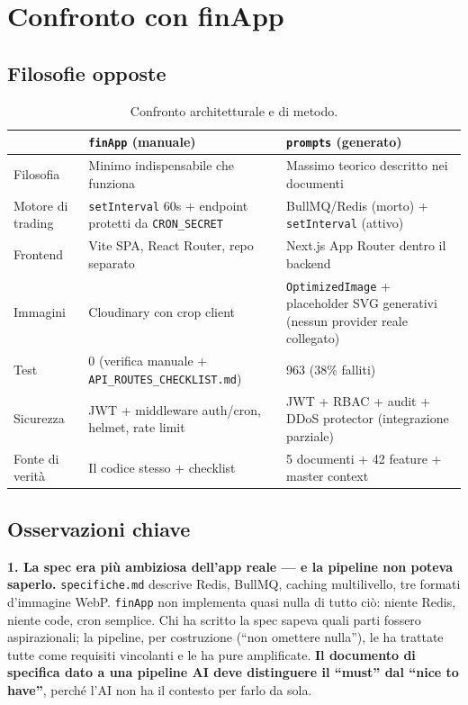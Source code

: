 \documentclass[11pt,a4paper]{article}
\newcommand{\file}[1]{\texttt{\small #1}}
\begin{document}
\section{Confronto con finApp}

\subsection{Filosofie opposte}

\begin{table}[h!]
\centering
\small
\begin{tabular}{p{4.2cm}p{4.9cm}p{4.9cm}}
\toprule
& \textbf{\file{finApp} (manuale)} & \textbf{\file{prompts} (generato)} \\
\midrule
Filosofia & Minimo indispensabile che funziona & Massimo teorico descritto nei documenti \\
Motore di trading & \file{setInterval} 60s + endpoint protetti da \file{CRON\_SECRET} & BullMQ/Redis (morto) + \file{setInterval} (attivo) \\
Frontend & Vite SPA, React Router, repo separato & Next.js App Router dentro il backend \\
Immagini & Cloudinary con crop client & \file{OptimizedImage} + placeholder SVG generativi (nessun provider reale collegato) \\
Test & 0 (verifica manuale + \file{API\_ROUTES\_CHECKLIST.md}) & 963 (38\% falliti) \\
Sicurezza & JWT + middleware auth/cron, helmet, rate limit & JWT + RBAC + audit + DDoS protector (integrazione parziale) \\
Fonte di verit\`a & Il codice stesso + checklist & 5 documenti + 42 feature + master context \\
\bottomrule
\end{tabular}
\caption{Confronto architetturale e di metodo.}
\end{table}

\subsection{Osservazioni chiave}

\textbf{1. La spec era pi\`u ambiziosa dell'app reale --- e la pipeline non poteva saperlo.} \file{specifiche.md} descrive Redis, BullMQ, caching multilivello, tre formati d'immagine WebP. \file{finApp} non implementa quasi nulla di tutto ci\`o: niente Redis, niente code, cron semplice. Chi ha scritto la spec sapeva quali parti fossero aspirazionali; la pipeline, per costruzione (``non omettere nulla''), le ha trattate tutte come requisiti vincolanti e le ha pure amplificate. \textbf{Il documento di specifica dato a una pipeline AI deve distinguere il ``must'' dal ``nice to have''}, perch\'e l'AI non ha il contesto per farlo da sola.
\end{document}
